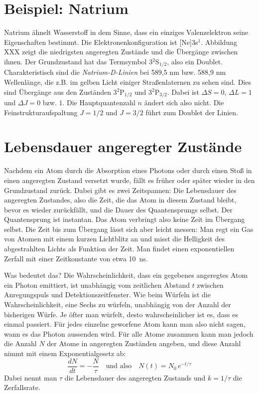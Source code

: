 \section{Beispiel: Natrium}


Natrium ähnelt Wasserstoff in dem Sinne, dass ein einziges Valenzelektron seine Eigenschaften bestimmt. Die Elektronenkonfiguration ist [Ne]3s$^1$. Abbildung XXX zeigt die niedrigsten angeregten Zustände und die Übergänge zwischen ihnen. Der Grundzustand hat das Termsymbol 3$^2$S$_{1/2}$, also ein Doublet. Charakteristisch sind die \emph{Natrium-D-Linien} bei 589,5 nm bzw. 588,9 nm Wellenlänge, die z.B. im gelben Licht einiger Straßenlaternen zu sehen sind.
Dies sind Übergänge aus den Zuständen 3$^2$P$_{1/2}$ und 3$^2$P$_{3/2}$. Dabei ist $\Delta S = 0$, $\Delta L = 1$ und $\Delta J = 0$ bzw. $1$. Die Hauptquantenzahl $n$ ändert sich also nicht. Die Feinstrukturaufspaltung $J = 1/2$ und $J=3/2$ führt zum Doublet der Linien.

\section{Lebensdauer angeregter Zustände}

Nachdem ein Atom durch die Absorption eines Photons oder durch einen Stoß in einen angeregten Zustand versetzt wurde, fällt es früher oder später wieder in den Grundzustand zurück. Dabei gibt es zwei Zeitspannen: Die Lebensdauer des angeregten Zustandes, also die Zeit, die das Atom in diesem Zustand bleibt, bevor es wieder zurückfällt, und die Dauer des Quantensprungs selbst. Der Quantensprung ist instantan. Das Atom verbringt also keine Zeit im Übergang selbst. Die Zeit bis zum Übergang lässt sich aber leicht messen: Man regt ein Gas von Atomen mit einem kurzen Lichtblitz an und misst die Helligkeit des abgestrahlten Lichts als Funktion der Zeit. Man findet einen exponentiellen Zerfall mit einer Zeitkonstante von etwa 10~ns.

Was bedeutet das? Die Wahrscheinlichkeit, dass ein gegebenes angeregtes Atom ein Photon emittiert, ist unabhängig vom zeitlichen Abstand $t$ zwischen Anregungspuls und Detektionszeitfenster. Wie beim Würfeln ist die Wahrscheinlichkeit, eine Sechs zu würfeln, unabhängig von der Anzahl der bisherigen Würfe. Je öfter man würfelt, desto wahrscheinlicher ist es, dass es einmal passiert. Für jedes einzelne geworfene Atom kann man also nicht sagen, wann es das Photon aussenden wird. Für alle Atome zusammen kann man jedoch die Anzahl $N$ der Atome in angeregten Zuständen angeben, und diese Anzahl nimmt mit einem Exponentialgesetz ab: 
\begin{equation}
    \frac{d N}{dt} = - \frac{N}{\tau} \quad \text{und also} \quad N(t) = N_0 \, e^{- t / \tau}
\end{equation} 
Dabei nennt man $\tau$ die Lebensdauer des angeregten Zustands und $k = 1 / \tau$ die Zerfallsrate.


